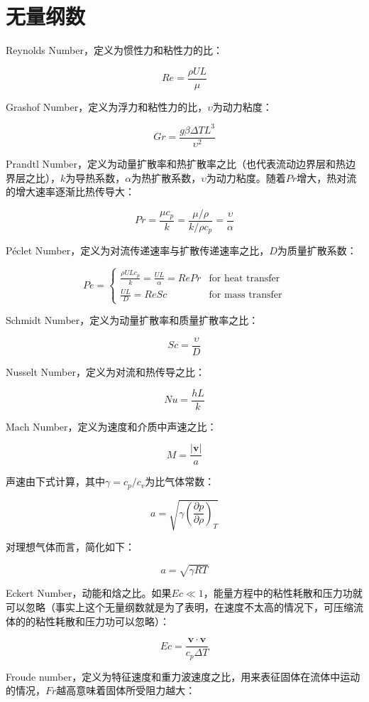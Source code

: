 \section{无量纲数}\label{dimensionless-number}

Reynolds Number，定义为惯性力和粘性力的比：

\[ Re = \frac{\rho UL}{\mu} \]

Grashof Number，定义为浮力和粘性力的比，$ \upsilon $为动力粘度：

\[ Gr = \frac{g\beta\Delta TL^3}{\upsilon^2} \]

Prandtl Number，定义为动量扩散率和热扩散率之比（也代表流动边界层和热边界层之比），$ k $为导热系数，$ \alpha $为热扩散系数，$ \upsilon $为动力粘度。随着$ Pr $增大，热对流的增大速率逐渐比热传导大：

\[ Pr = \frac{\mu c_p}{k} = \frac{\mu/\rho}{k/\rho c_p} = \frac{\upsilon}{\alpha} \]

P\'{e}clet Number，定义为对流传递速率与扩散传递速率之比，$ D $为质量扩散系数：

\[ Pe =
\begin{cases}
\frac{\rho ULc_p}{k} = \frac{UL}{\alpha} = RePr & \text{for heat transfer}\\
\frac{UL}{D} = ReSc & \text{for mass transfer}
\end{cases}
\]

Schmidt Number，定义为动量扩散率和质量扩散率之比：

\[ Sc = \frac{\upsilon}{D} \]

Nusselt Number，定义为对流和热传导之比：

\[Nu = \frac{hL}{k}\]

Mach Number，定义为速度和介质中声速之比：

\[ M = \frac{|\mathbf{v}|}{a} \]

声速由下式计算，其中$ \gamma=c_p/c_v $为比气体常数：

\[a=\sqrt{\gamma\left( \frac{\partial p}{\partial \rho} \right)_T}\]

对理想气体而言，简化如下：

\[a=\sqrt{\gamma RT}\]

Eckert Number，动能和焓之比。如果$ Ec\ll 1 $，能量方程中的粘性耗散和压力功就可以忽略（事实上这个无量纲数就是为了表明，在速度不太高的情况下，可压缩流体的的粘性耗散和压力功可以忽略）：

\[Ec=\frac{\mathbf{v\cdot v}}{c_p\Delta T}\]

Froude number，定义为特征速度和重力波速度之比，用来表征固体在流体中运动的情况，$ Fr $越高意味着固体所受阻力越大：


